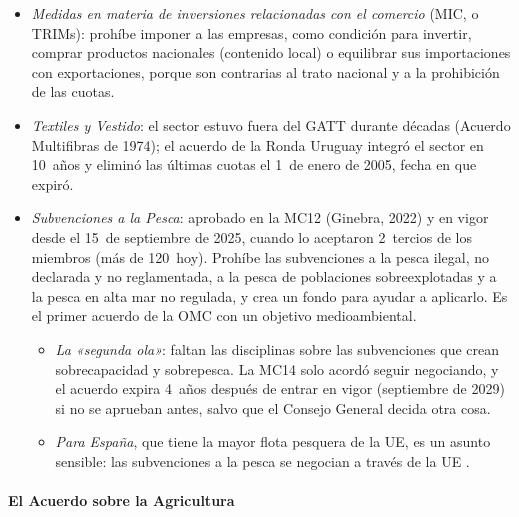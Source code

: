 \documentclass[11pt]{article}
\begin{document}
\begin{itemize}
\item \emph{Medidas en materia de inversiones relacionadas con el comercio} (MIC, o TRIMs): prohíbe imponer a las empresas, como condición para invertir, comprar productos nacionales (contenido local) o equilibrar sus importaciones con exportaciones, porque son contrarias al trato nacional y a la prohibición de las cuotas.
\item \emph{Textiles y Vestido}: el sector estuvo fuera del GATT durante décadas (Acuerdo Multifibras de 1974); el acuerdo de la Ronda Uruguay integró el sector en 10~años y eliminó las últimas cuotas el 1~de enero de 2005, fecha en que expiró\nocite{OMC2026Textiles}.
\item \emph{Subvenciones a la Pesca}: aprobado en la MC12 (Ginebra, 2022) y en vigor desde el 15~de septiembre de 2025, cuando lo aceptaron 2~tercios de los miembros (más de 120~hoy). Prohíbe las subvenciones a la pesca ilegal, no declarada y no reglamentada, a la pesca de poblaciones sobreexplotadas y a la pesca en alta mar no regulada, y crea un fondo para ayudar a aplicarlo. Es el primer acuerdo de la OMC con un objetivo medioambiental\nocite{OMC2026Pesca}.
  \begin{itemize}
  \item \emph{La «segunda ola»}: faltan las disciplinas sobre las subvenciones que crean sobrecapacidad y sobrepesca. La MC14 solo acordó seguir negociando, y el acuerdo expira 4~años después de entrar en vigor (septiembre de 2029) si no se aprueban antes, salvo que el Consejo General decida otra cosa.
  \item \emph{Para España}, que tiene la mayor flota pesquera de la UE, es un asunto sensible: las subvenciones a la pesca se negocian a través de la UE  .
  \end{itemize}
\end{itemize}

\paragraph{El Acuerdo sobre la Agricultura}
\end{document}

